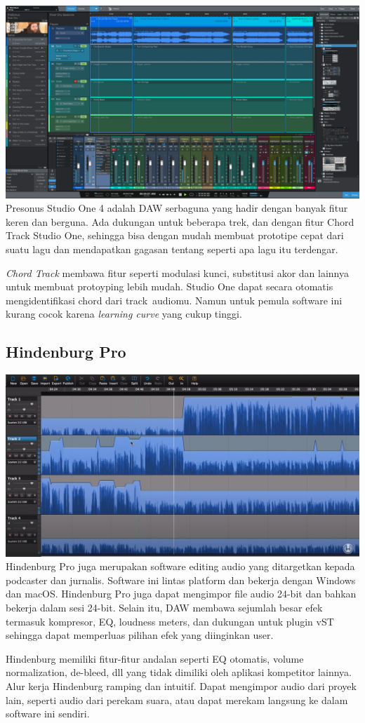 \documentclass[12pt,a4paper]{report}
\begin{document}
  \includegraphics[width=\textwidth]{images/studioone.png} Presonus Studio One 4 adalah DAW
  serbaguna yang hadir dengan banyak fitur keren dan berguna. Ada dukungan
  untuk beberapa trek, dan dengan fitur Chord Track Studio One, sehingga
  bisa dengan mudah membuat prototipe cepat dari suatu lagu dan
  mendapatkan gagasan tentang seperti apa lagu itu terdengar.

  \emph{Chord Track} membawa fitur seperti modulasi kunci, substitusi akor
  dan lainnya untuk membuat protoyping lebih mudah. Studio One dapat
  secara otomatis mengidentifikasi chord dari track~audiomu. Namun untuk
  pemula software ini kurang cocok karena \emph{learning curve} yang cukup
  tinggi.

  \subsection*{Hindenburg Pro}\label{hindenburg-pro}

  \includegraphics[width=\textwidth]{images/hindenburg.jpg} Hindenburg Pro juga merupakan
  software editing audio yang ditargetkan kepada podcaster dan jurnalis.
  Software ini lintas platform dan bekerja dengan Windows dan macOS.
  Hindenburg Pro juga dapat mengimpor file audio 24-bit dan bahkan bekerja
  dalam sesi 24-bit. Selain itu, DAW membawa sejumlah besar efek termasuk
  kompresor, EQ, loudness meters, dan dukungan untuk plugin vST sehingga
  dapat memperluas pilihan efek yang diinginkan user.

  Hindenburg memiliki fitur-fitur andalan seperti EQ otomatis, volume
  normalization, de-bleed, dll yang tidak dimiliki oleh aplikasi
  kompetitor lainnya. Alur kerja Hindenburg ramping dan intuitif. Dapat
  mengimpor audio dari proyek lain, seperti audio dari perekam suara, atau
  dapat merekam langsung ke dalam software ini sendiri.
  
\end{document}
